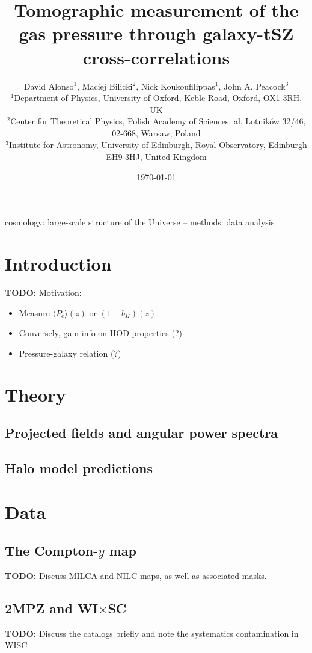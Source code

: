 \documentclass[useAMS,usenatbib]{mn2e}
\title[Tomographic measurement of the gas pressure through galaxy-tSZ cross-correlations]{Tomographic measurement of the gas pressure through galaxy-tSZ cross-correlations}
\author[David Alonso]{David Alonso$^1$, Maciej Bilicki$^2$, Nick Koukoufilippas$^1$, John A. Peacock$^3$\\
                      $^{1}$Department of Physics, University of Oxford, Keble Road, Oxford, OX1 3RH, UK\\
                      $^{2}$Center for Theoretical Physics, Polish Academy of Sciences, al. Lotnik\'ow 32/46, 02-668, Warsaw, Poland\\
                      $^{3}$Institute for Astronomy, University of Edinburgh, Royal Observatory, Edinburgh EH9 3HJ, United Kingdom
                      }
\newcommand{\TODO}[1]{{\bf TODO:} #1}
\begin{document}
  \date{\today}
   
  \maketitle

\begin{abstract}
  \lipsum[1]
\end{abstract}

\begin{keywords}
  cosmology: large-scale structure of the Universe -- methods: data analysis
\end{keywords}

\section{Introduction}\label{sec:intro}
  \TODO{Motivation:}
  \begin{itemize}
    \item Measure $\langle P_e\rangle(z)$ or $(1-b_H)(z)$.
    \item Conversely, gain info on HOD properties (?)
    \item Pressure-galaxy relation (?)
  \end{itemize}

\section{Theory}\label{sec:theory}
  \subsection{Projected fields and angular power spectra}\label{ssec:theory.cls}
  \subsection{Halo model predictions}\label{ssec:theory.hm}

\section{Data}\label{sec:data}
  \subsection{The Compton-$y$ map}\label{ssec:data.y}
    \TODO{Discuss MILCA and NILC maps, as well as associated masks.}
  \subsection{2MPZ and WI$\times$SC}\label{ssec:data.g1}
    \TODO{Discuss the catalogs briefly and note the systematics contamination in WISC}
\end{document}
